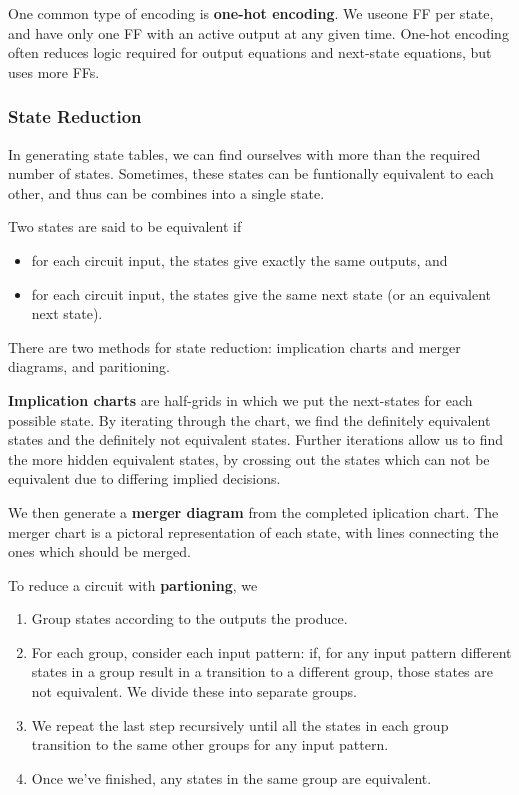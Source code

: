 \documentclass[12pt]{article}
\begin{document}
One common type of encoding is {\bf one-hot encoding}. We useone FF per state, and have only one FF with an active output at any given time. One-hot encoding often reduces logic required for output equations and next-state equations, but uses more FFs.

\subsubsection*{State Reduction}
In generating state tables, we can find ourselves with more than the required number of states. Sometimes, these states can be funtionally equivalent to each other, and thus can be combines into a single state.

Two states are said to be equivalent if
\begin{itemize}
\item for each circuit input, the states give exactly the same outputs, and
\item for each circuit input, the states give the same next state (or an equivalent next state).
\end{itemize}

There are two methods for state reduction: implication charts and merger diagrams, and paritioning.

{\bf Implication charts} are half-grids in which we put the next-states for each possible state. By iterating through the chart, we find the definitely equivalent states and the definitely not equivalent states. Further iterations allow us to find the more hidden equivalent states, by crossing out the states which can not be equivalent due to differing implied decisions.

We then generate a {\bf merger diagram} from the completed iplication chart. The merger chart is a pictoral representation of each state, with lines connecting the ones which should be merged.

To reduce a circuit with {\bf partioning}, we
\begin{enumerate}
\item Group states according to the outputs the produce.
\item For each group, consider each input pattern: if, for any input pattern different states in a group result in a transition to a different group, those states are not equivalent. We divide these into separate groups.
\item We repeat the last step recursively until all the states in each group transition to the same other groups for any input pattern.
\item Once we've finished, any states in the same group are equivalent.
\end{enumerate}
\end{document}
